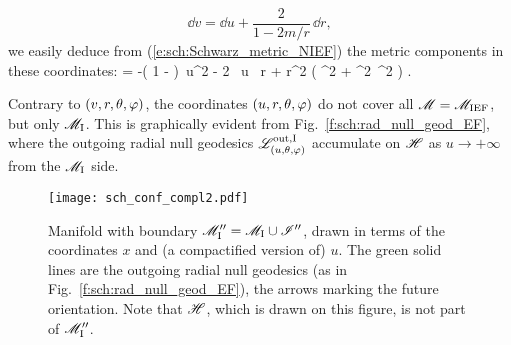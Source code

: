 \[
    \dd v = \dd u + \frac{2}{1-2m/r}\, \dd r,
\]
we easily deduce from (\ref{e:sch:Schwarz_metric_NIEF}) the metric components
in these coordinates:
\be \label{e:sch:g_u_r}
     = -\left( 1 -  \right)\, \dd u^2
            - 2 \, \dd u \, \dd r
        + r^2 \left( \dd\th^2 + \sin^2\th\, \dd\ph^2 \right) .
\ee
\begin{remark}
Contrary to $(v,r,\theta,\varphi)$, the coordinates $(u,r,\theta,\varphi)$ do not cover
all $\mathscr{M} = \mathscr{M}_{\rm IEF}$, but only $\mathscr{M}_{\rm I}$. This is graphically
evident from
Fig.~\ref{f:sch:rad_null_geod_EF}, where the outgoing radial null geodesics
$\mathscr{L}^{\rm out,I}_{(u,\theta,\varphi)}$
accumulate on $\mathscr{H}$ as $u\rightarrow +\infty$
from the $\mathscr{M}_{\rm I}$ side.
\end{remark}

\begin{figure}
\centerline{\texttt{[image: sch\_conf\_compl2.pdf]}}
\caption[]{\label{f:sch:conf_compl2} \footnotesize
Manifold with boundary
$\mathscr{M}''_{\rm I} = \mathscr{M}_{\rm I}\cup\mathscr{I}''$, drawn in terms of
the coordinates $x$ and (a compactified version of) $u$.
The green solid lines are the outgoing radial null geodesics (as in Fig.~\ref{f:sch:rad_null_geod_EF}), the arrows marking the future orientation.
Note that $\mathscr{H}$, which is drawn on this figure, is not part of $\mathscr{M}''_{\rm I}$.}
\end{figure}

